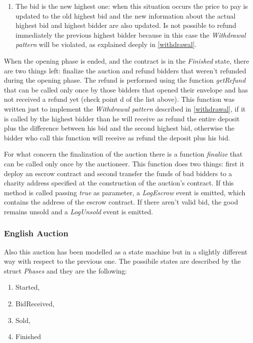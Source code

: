 \documentclass{article}
\begin{document}
\begin{enumerate}
\begin{enumerate}
        \item The bid is the new highest one: when this situation occurs the price to pay is updated to the old highest bid and the new information about the actual highest bid and highest bidder are also updated. Is not possible to refund immediately the previous highest bidder because in this case the \textit{Withdrawal pattern} will be violated, as explained deeply in \ref{withdrawal}.
    \end{enumerate}
\end{enumerate}

When the opening phase is ended, and the contract is in the \textit{Finished} state, there are two things left: finalize the auction and refund bidders that weren't refunded during the opening phase.
The refund is performed using the function \textit{getRefund} that can be called only once by those bidders that opened their envelope and has not received a refund yet (check point d of the list above). This function was written just to implement the \textit{Withdrawal pattern} described in \ref{withdrawal}, if it is called by the highest bidder than he will receive as refund the entire deposit plus the difference between his bid and the second highest bid, otherwise the bidder who call this function will receive as refund the deposit plus his bid.

For what concern the finalization of the auction there is a function \textit{finalize} that can be called only once by the auctioneer. This function does two things: first it deploy an escrow contract and second transfer the funds of bad bidders to a charity address specified at the construction of the auction's contract. If this method is called passing \textit{true} as parameter, a \textit{LogEscrow} event is emitted, which contains the address of the escrow contract. If there aren't valid bid, the good remains unsold and a \textit{LogUnsold} event is emitted.

\subsubsection{English Auction}\label{english}
Also this auction has been modelled as a state machine but in a slightly different way with respect to the previous one. The possibile states are described by the struct \textit{Phases} and they are the following:
\begin{enumerate}
    \item Started,
    \item BidReceived,
    \item Sold,
    \item Finished
\end{enumerate}
\end{document}
